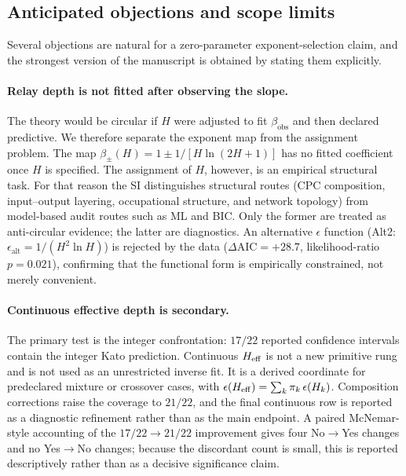 \subsection{Anticipated objections and scope limits}\label{subsec:anticipated_objections}

Several objections are natural for a zero-parameter exponent-selection claim,
and the strongest version of the manuscript is obtained by stating them
explicitly.

\paragraph{Relay depth is not fitted after observing the slope.}
The theory would be circular if \(H\) were adjusted to fit
\(\beta_{\mathrm{obs}}\) and then declared predictive.  We therefore separate
the exponent map from the assignment problem.  The map
\(\beta_{\pm}(H)=1\pm 1/[H\ln(2H+1)]\) has no fitted coefficient once \(H\) is
specified.  The assignment of \(H\), however, is an empirical structural task.
For that reason the SI distinguishes structural routes (CPC composition,
input--output layering, occupational structure, and network topology) from
model-based audit routes such as ML and BIC.  Only the former are treated as
anti-circular evidence; the latter are diagnostics.  An alternative
\(\epsilon\) function (Alt2: \(\epsilon_{\mathrm{alt}}=1/(H^{2}\ln H)\)) is
rejected by the data (\(\Delta\mathrm{AIC}=+28.7\), likelihood-ratio
\(p=0.021\)), confirming that the functional form is empirically constrained,
not merely convenient.

\paragraph{Continuous effective depth is secondary.}
The primary test is the integer confrontation: \(17/22\) reported confidence
intervals contain the integer Kato prediction.  Continuous \(H_{\mathrm{eff}}\) is not a
new primitive rung and is not used as an unrestricted inverse fit.  It is a
derived coordinate for predeclared mixture or crossover cases, with
\(\epsilon(H_{\mathrm{eff}})=\sum_k\pi_k\,\epsilon(H_k)\).  Composition corrections raise
the coverage to \(21/22\), and the final continuous row is reported as a
diagnostic refinement rather than as the main endpoint.  A paired
McNemar-style accounting of the \(17/22\to 21/22\) improvement gives four
No\(\to\)Yes changes and no Yes\(\to\)No changes; because the discordant count
is small, this is reported descriptively rather than as a decisive
significance claim.

